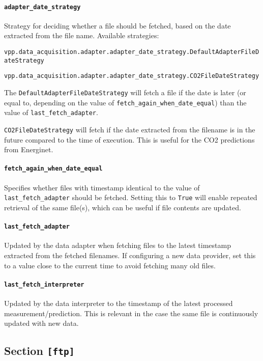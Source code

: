 {\paragraph{\texttt{adapter\_date\_strategy}} 
Strategy for deciding whether a file should be fetched, based on the date extracted from the file name. Available strategies:

\texttt{vpp.data\_acquisition.adapter.adapter\_date\_strategy.DefaultAdapterFileDateStrategy}

\texttt{vpp.data\_acquisition.adapter.adapter\_date\_strategy.CO2FileDateStrategy}


The \texttt{DefaultAdapterFileDateStrategy} will fetch a file if the date is later (or equal to, depending on the value of \texttt{fetch\_again\_when\_date\_equal}) than the value of \texttt{last\_fetch\_adapter}.

\texttt{CO2FileDateStrategy} will fetch if the date extracted from the filename is in the future compared to the time of execution. This is useful for the CO2 predictions from Energinet.


\paragraph{\texttt{fetch\_again\_when\_date\_equal}}  Specifies whether files with timestamp identical to the value of \texttt{last\_fetch\_adapter} should be fetched. Setting this to \texttt{True} will enable repeated retrieval of the same file(s), which can be useful if file contents are updated.

\paragraph{\texttt{last\_fetch\_adapter}} Updated by the data adapter when fetching files to the latest timestamp extracted from the fetched filenames. If configuring a new data provider, set this to a value close to the current time to avoid fetching many old files.

\paragraph{\texttt{last\_fetch\_interpreter}} Updated by the data interpreter to the timestamp of the latest processed measurement/prediction. This is relevant in the case the same file is continuously updated with new data.


\subsection{Section \texttt{[ftp]}}

}
